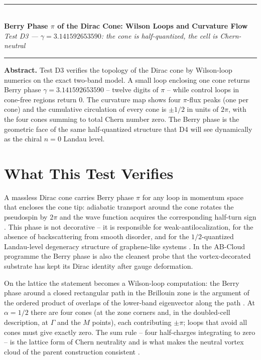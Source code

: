 \documentclass[11pt,a4paper]{article}
\begin{document}
\\[0.3em]
\rule{\textwidth}{0.8pt}\\[0.6em]
{\LARGE\bfseries\color{labblue} Berry Phase $\pi$ of the Dirac Cone: Wilson Loops and Curvature Flow}\\[0.5em]
{\normalsize\itshape Test D3 — $\gamma = 3.141592653590$: the cone is half-quantized, the cell is Chern-neutral}\\[0.4em]
\rule{\textwidth}{0.4pt}

\begin{tcolorbox}[colback=labgreen!8, colframe=labgreen!70!black, title={Verdict: PASS — 4/4 checks}, fonttitle=\bfseries, boxrule=0.6pt]
\textbf{Abstract.} Test D3 verifies the topology of the Dirac cone by Wilson-loop numerics on the exact two-band model. A small loop enclosing one cone returns Berry phase $\gamma = 3.141592653590$ -- twelve digits of $\pi$ -- while control loops in cone-free regions return $0$. The curvature map shows four $\pi$-flux peaks (one per cone) and the cumulative circulation of every cone is $\pm 1/2$ in units of $2\pi$, with the four cones summing to total Chern number zero. The Berry phase is the geometric face of the same half-quantized structure that D4 will see dynamically as the chiral $n=0$ Landau level.
\end{tcolorbox}

\section{What This Test Verifies}
A massless Dirac cone carries Berry phase $\pi$ for any loop in momentum space that encloses the cone tip: adiabatic transport around the cone rotates the pseudospin by $2\pi$ and the wave function acquires the corresponding half-turn sign \cite{berry}. This phase is not decorative -- it is responsible for weak-antilocalization, for the absence of backscattering from smooth disorder, and for the $1/2$-quantized Landau-level degeneracy structure of graphene-like systems \cite{mecklenburgshen}. In the AB-Cloud programme the Berry phase is also the cleanest probe that the vortex-decorated substrate has kept its Dirac identity after gauge deformation.

On the lattice the statement becomes a Wilson-loop computation: the Berry phase around a closed rectangular path in the Brillouin zone is the argument of the ordered product of overlaps of the lower-band eigenvector along the path \cite{berry}. At $\alpha = 1/2$ there are four cones (at the zone corners and, in the doubled-cell description, at $\Gamma$ and the $M$ points), each contributing $\pm\pi$; loops that avoid all cones must give exactly zero. The sum rule -- four half-charges integrating to zero -- is the lattice form of Chern neutrality and is what makes the neutral vortex cloud of the parent construction consistent \cite{parent}.
\end{document}
